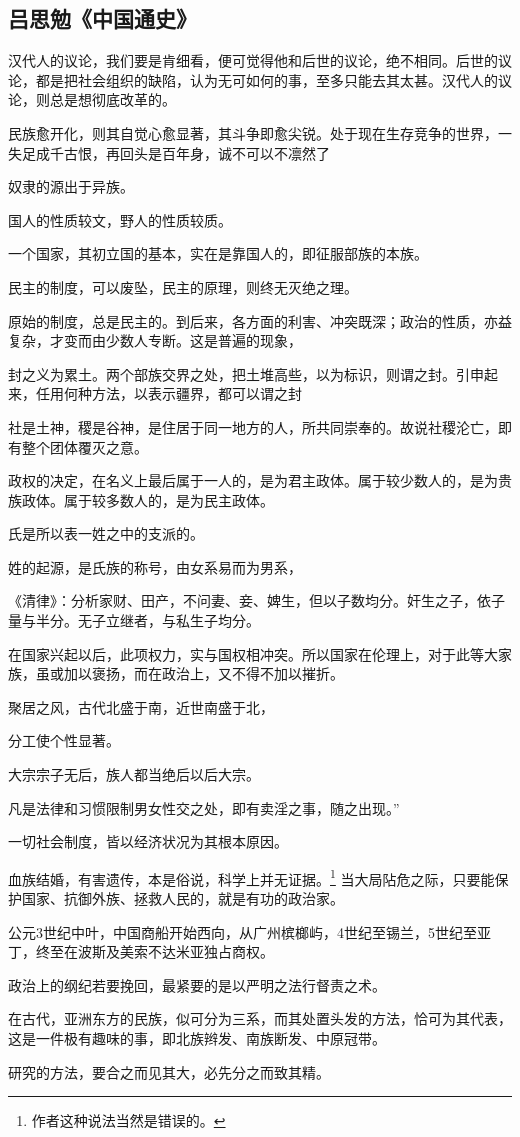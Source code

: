 \subsection{吕思勉《中国通史》}
汉代人的议论，我们要是肯细看，便可觉得他和后世的议论，绝不相同。后世的议论，都是把社会组织的缺陷，认为无可如何的事，至多只能去其太甚。汉代人的议论，则总是想彻底改革的。

民族愈开化，则其自觉心愈显著，其斗争即愈尖锐。处于现在生存竞争的世界，一失足成千古恨，再回头是百年身，诚不可以不凛然了

奴隶的源出于异族。

国人的性质较文，野人的性质较质。

一个国家，其初立国的基本，实在是靠国人的，即征服部族的本族。

民主的制度，可以废坠，民主的原理，则终无灭绝之理。

原始的制度，总是民主的。到后来，各方面的利害、冲突既深；政治的性质，亦益复杂，才变而由少数人专断。这是普遍的现象，

封之义为累土。两个部族交界之处，把土堆高些，以为标识，则谓之封。引申起来，任用何种方法，以表示疆界，都可以谓之封

社是土神，稷是谷神，是住居于同一地方的人，所共同崇奉的。故说社稷沦亡，即有整个团体覆灭之意。

政权的决定，在名义上最后属于一人的，是为君主政体。属于较少数人的，是为贵族政体。属于较多数人的，是为民主政体。

氏是所以表一姓之中的支派的。

姓的起源，是氏族的称号，由女系易而为男系，

《清律》：分析家财、田产，不问妻、妾、婢生，但以子数均分。奸生之子，依子量与半分。无子立继者，与私生子均分。

在国家兴起以后，此项权力，实与国权相冲突。所以国家在伦理上，对于此等大家族，虽或加以褒扬，而在政治上，又不得不加以摧折。

聚居之风，古代北盛于南，近世南盛于北，

分工使个性显著。

大宗宗子无后，族人都当绝后以后大宗。

凡是法律和习惯限制男女性交之处，即有卖淫之事，随之出现。”

一切社会制度，皆以经济状况为其根本原因。

血族结婚，有害遗传，本是俗说，科学上并无证据。\footnote{作者这种说法当然是错误的。}
当大局阽危之际，只要能保护国家、抗御外族、拯救人民的，就是有功的政治家。

公元3世纪中叶，中国商船开始西向，从广州槟榔屿，4世纪至锡兰，5世纪至亚丁，终至在波斯及美索不达米亚独占商权。

政治上的纲纪若要挽回，最紧要的是以严明之法行督责之术。

在古代，亚洲东方的民族，似可分为三系，而其处置头发的方法，恰可为其代表，这是一件极有趣味的事，即北族辫发、南族断发、中原冠带。

研究的方法，要合之而见其大，必先分之而致其精。